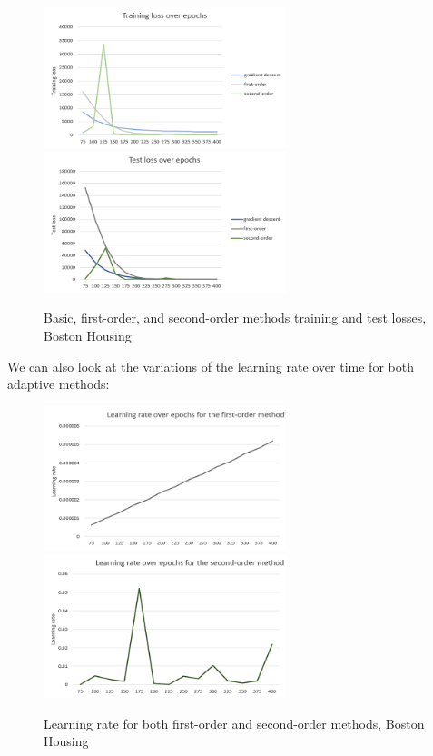 \documentclass{article}
\begin{document}
  \begin{figure}[!h]
	\includegraphics[width=200pt]{loss_train_linear.png}
	\includegraphics[width=200pt]{loss_test_linear.png}
	\caption{Basic, first-order, and second-order methods training and test losses, Boston Housing}
  \end{figure}

  We can also look at the variations of the learning rate over time for both adaptive methods:\\
  
  \begin{figure}[!h]
	\includegraphics[width=200pt]{lr_linear_1st_order.png}
	\includegraphics[width=200pt]{lr_linear_2nd_order.png}
	\caption{Learning rate for both first-order and second-order methods, Boston Housing}
  \end{figure}  
  
\end{document}
